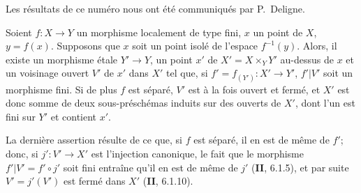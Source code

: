 Les résultats de ce numéro nous ont été communiqués par P.~Deligne.

\begin{theorem}[18.12.1]
\label{IV.18.12.1}
Soient $f:X\to Y$ un morphisme localement de type fini, $x$ un point de $X$, $y=f(x)$. Supposons que $x$ soit un point isolé de l'espace $f^{-1}(y)$. Alors, il existe un morphisme étale $Y'\to Y$, un point $x'$ de $X'=X\times_Y Y'$ au-dessus de $x$ et un voisinage ouvert $V'$ de $x'$ dans $X'$ tel que, si $f'=f_{(Y')}:X'\to Y'$, $f'|V'$ soit un morphisme fini. Si de plus $f$ est séparé, $V'$ est à la fois ouvert et fermé, et $X'$ est donc somme de deux sous-préschémas induits sur des ouverts de $X'$, dont l'un est fini sur $Y'$ et contient $x'$.
\end{theorem}

La dernière assertion résulte de ce que, si $f$ est séparé, il en est de même de $f'$; donc, si $j':V'\to X'$ est l'injection canonique, le fait que le morphisme $f'|V'=f'\circ j'$ soit fini entraîne qu'il en est de même de $j'$ (\textbf{II}, 6.1.5), et par suite $V'=j'(V')$ est fermé dans $X'$ (\textbf{II}, 6.1.10).

